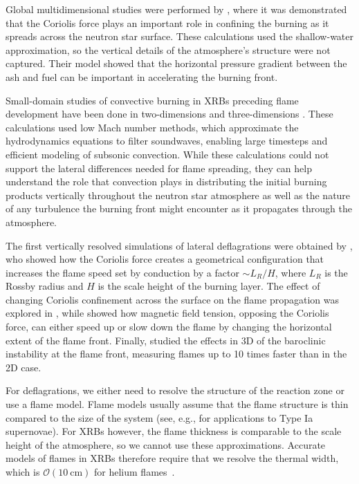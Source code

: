 \documentclass[preprint,times,tighten]{aastex63}
\begin{document}
Global multidimensional studies were performed by
\citet{spitkovsky2002}, where it was demonstrated that the Coriolis
force plays an important role in confining the burning as it spreads
across the neutron star surface.  These calculations used the
shallow-water approximation, so the vertical details of the
atmosphere's structure were not captured.  Their model showed that the
horizontal pressure gradient between the ash and fuel can be important
in accelerating the burning front.

Small-domain studies of convective burning in XRBs preceding flame
development have been done in two-dimensions \citep{lin:2006,xrb,xrb2}
and three-dimensions \citep{xrb3d}.  These calculations used low Mach
number methods, which approximate the hydrodynamics equations to filter
soundwaves, enabling large timesteps and efficient modeling of
subsonic convection.  While these calculations could not support
the lateral differences needed for flame spreading, they can help
understand the role that convection plays in distributing the initial
burning products vertically throughout the neutron star atmosphere as well
as the nature of any turbulence the burning front might encounter as it propagates
through the atmosphere.


The first vertically resolved simulations of lateral deflagrations
were obtained by \citet{cavecchi:2013}, who showed how the Coriolis
force creates a geometrical configuration that increases the flame
speed set by conduction by a factor $\sim L_R / H$, where $L_R$ is the
Rossby radius and $H$ is the scale height of the burning layer. The
effect of changing Coriolis confinement across the surface on the flame 
propagation was explored in \citet{art-2015-cavecchi-etal},
while \citet{art-2016-cavecchi-etal} showed how magnetic field tension,
opposing the Coriolis force, can either speed up or slow down the flame by
changing the horizontal extent of the flame front. Finally, \citet{Cavecchi2019}
studied the effects in 3D of the baroclinic instability at the flame
front, measuring flames up to 10 times faster than in the 2D case.

For deflagrations, we either need to resolve the structure of the
reaction zone or use a flame model.  Flame models usually assume that
the flame structure is thin compared to the size of the system (see,
e.g., \citet{Ropke2007} for applications to Type Ia supernovae).  For
XRBs however, the flame thickness is comparable to the scale height of
the atmosphere, so we cannot use these approximations.  Accurate
models of flames in XRBs therefore require that we resolve the thermal width,
which is $\mathcal{O}(10~\mbox{cm})$ for helium flames~\citep{Timmes00}.
\end{document}

